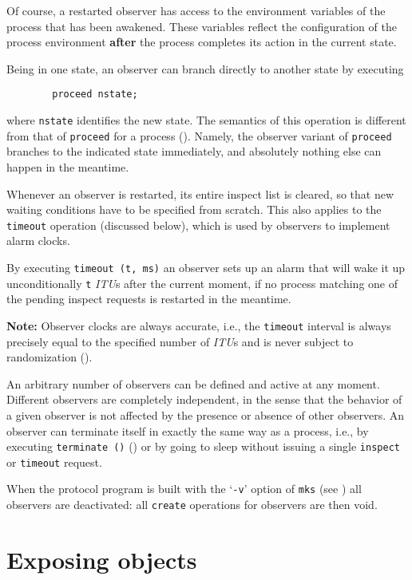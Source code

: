 \medskip

\noindent
Of course, a restarted observer has access to the environment variables of
the process that has been awakened.
These variables reflect
the configuration of the process environment {\bf after} the process completes
its action in the current state.

Being in one state,
an observer can branch directly to another state by executing
\begin{verbatim}
        proceed nstate;
\end{verbatim}
where {\tt nstate} identifies the new state.
The semantics of this operation is different from that of {\tt proceed}
for a process ().
Namely, the observer variant of
{\tt proceed} branches to the indicated state immediately, and absolutely
nothing else can happen in the meantime.

Whenever an observer is restarted, its entire inspect list is cleared,
so that new waiting conditions have to be specified from scratch.
This also applies to the {\tt timeout} operation (discussed below),
which is used by observers to implement alarm clocks.

By executing
{\tt timeout~(t,~ms)}
an observer sets up an alarm that will wake
it up unconditionally {\tt t} {\em ITU\/}s after the current
moment, if no process matching one of the pending inspect requests
is restarted in the meantime.

\medskip

\noindent
{\bf Note:} Observer clocks are always accurate, i.e., the
{\tt timeout} interval is always precisely equal to the specified
number of {\em ITU\/}s and is never subject to randomization
().

\medskip

An arbitrary number of observers can be defined and active at any moment.
Different observers are completely independent, in the sense that the
behavior of a given observer is not affected by the presence or absence of
other observers.
An observer can terminate itself in exactly the same way as a
process, i.e.,
by executing {\tt terminate~()} ()
or by going to sleep without issuing a single
{\tt inspect} or {\tt timeout} request.

When the protocol program is built with the `{\tt -v}' option of {\tt mks}
(see )
all observers are deactivated: all {\tt create}
operations for observers are then void.

\section{Exposing objects}
\label{rm_ex}

